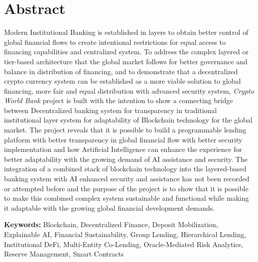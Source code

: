 \section*{Abstract}

Modern Institutional Banking is established in layers to obtain better control of global financial flows to create intentional restrictions for equal access to financing capabilities and centralized system. To address the complex layered or tier-based architecture that the global market follows for better governance and balance in distribution of financing, and to demonstrate that a decentralized crypto currency system can be established as a more viable solution to global financing, more fair and equal distribution with advanced security system, \textit{Crypto World Bank} project is built with the intention to show a connecting bridge between Decentralized banking system for transparency in traditional institutional layer system for adaptability of Blockchain technology for the global market. The project reveals that it is possible to build a programmable lending platform with better transparency in global financial flow with better security implementation and how Artificial Intelligence can enhance the experience for better adaptability with the growing demand of AI assistance and security. The integration of a combined stack of blockchain technology into the layered-based banking system with AI enhanced security and assistance has not been recorded or attempted before and the purpose of the project is to show that it is possible to make this combined complex system sustainable and functional while making it adaptable with the growing global financial development demands.

\vspace{0.5em}
\noindent\textbf{Keywords:} Blockchain, Decentralized Finance, Deposit Mobilization, Explainable AI, Financial Sustainability, Group Lending, Hierarchical Lending, Institutional DeFi, Multi-Entity Co-Lending, Oracle-Mediated Risk Analytics, Reserve Management, Smart Contracts
